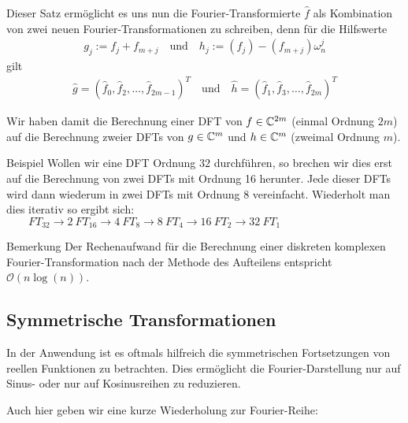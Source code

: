 
Dieser Satz ermöglicht es uns nun die Fourier-Transformierte $\hat{f}$ als Kombination von zwei neuen 
Fourier-Transformationen zu schreiben, denn für die Hilfswerte
%
\begin{align*}
  g_{j} := f_j + f_{m+j} 
  \quad \text{und}\quad 
  h_{j} := (f_j) - (f_{m+j})\omega_n^j
\end{align*}
%
gilt 
\begin{align*}
  \hat{g} = (\hat{f}_0,\hat{f}_2,\dots,\hat{f}_{2m-1})^T 
  \quad\text{und}\quad 
  \hat{h} = (\hat{f}_1,\hat{f}_3,\dots,\hat{f}_{2m})^T 
\end{align*}

Wir haben damit die Berechnung einer DFT von $f\in\mathbb C^{2m}$ (einmal Ordnung $2m$) auf die Berechnung zweier DFTs von 
$g\in\mathbb C^m$ und $h\in\mathbb C^m$ (zweimal Ordnung $m$). 

\begin{colbox}{Beispiel}
  Wollen wir eine DFT Ordnung $32$ durchführen, so brechen wir dies erst auf die Berechnung von zwei DFTs mit Ordnung 
  16 herunter. Jede dieser DFTs wird dann wiederum in zwei DFTs mit Ordnung 8 vereinfacht. Wiederholt man dies iterativ 
  so ergibt sich:\\
  $
  \qquad FT_{32} 
  \rightarrow 2\ FT_{16} 
  \rightarrow 4\ FT_{8} 
  \rightarrow 8\ FT_{4} 
  \rightarrow 16\ FT_{2} 
  \rightarrow 32\ FT_{1}
  $
\end{colbox}

\begin{colbox}{Bemerkung}
  Der Rechenaufwand für die Berechnung einer diskreten komplexen Fourier-Transformation nach der Methode des Aufteilens
  entspricht $\mathcal{O}(n\log(n))$.
\end{colbox}

\subsection{Symmetrische Transformationen}
In der Anwendung ist es oftmals hilfreich die symmetrischen Fortsetzungen von reellen Funktionen zu betrachten. Dies 
ermöglicht die Fourier-Darstellung nur auf Sinus- oder nur auf Kosinusreihen zu reduzieren.

Auch hier geben wir eine kurze Wiederholung zur Fourier-Reihe:

